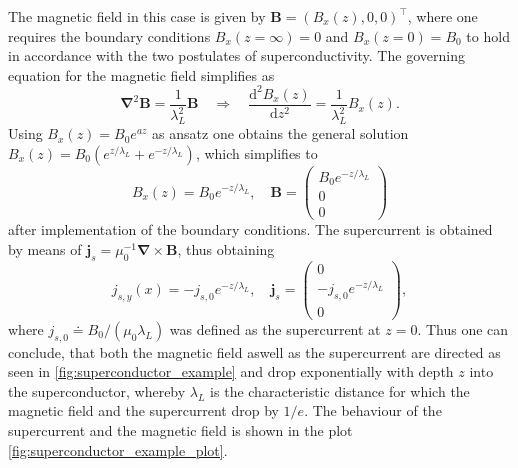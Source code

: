 \documentclass{report}
\numberwithin{tm}{section}
\newcommand\vect[1]{\ensuremath{\bm{#1}}}
\begin{document}
The magnetic field in this case is given by $\vect{B} = (B_x(z),0,0)^\top$, where one requires the boundary conditions $B_x(z=\infty)=0$ and $B_x(z=0)=B_0$ to hold in accordance with the two postulates of superconductivity. The governing equation for the magnetic field simplifies as \begin{equation}
	\vect{\nabla}^2\vect{B} = \frac{1}{\lambda_L^2}\vect{B} \quad \Rightarrow \quad \frac{\mathrm{d}^2B_x(z)}{\mathrm{d}z^2} = \frac{1}{\lambda_L^2}B_x(z).
\end{equation} Using $B_x(z) = B_0e^{az}$ as ansatz one obtains the general solution $B_x(z) = B_0(e^{z/\lambda_L}+e^{-z/\lambda_L})$, which simplifies to \begin{equation}
B_x(z) = B_0e^{-z/\lambda_L}, \quad \vect{B} = \begin{pmatrix}
	B_0 e^{-z/\lambda_L} \\ 0 \\ 0
\end{pmatrix}
\end{equation} after implementation of the boundary conditions. The supercurrent is obtained by means of $\vect{j}_s = \mu_0^{-1}\vect{\nabla} \times \vect{B}$, thus obtaining \begin{equation}
j_{s,y}(x) = -j_{s,0}e^{-z/\lambda_L}, \quad \vect{j}_s = \begin{pmatrix}
	0 \\ -j_{s,0}e^{-z/\lambda_L} \\ 0
\end{pmatrix},
\end{equation} where $j_{s,0} \doteq B_0/(\mu_0\lambda_L)$ was defined as the supercurrent at $z=0$. Thus one can conclude, that both the magnetic field aswell as the supercurrent are directed as seen in \cref{fig:superconductor_example} and drop exponentially with depth $z$ into the superconductor, whereby $\lambda_L$ is the characteristic distance for which the magnetic field and the supercurrent drop by $1/e$. The behaviour of the supercurrent and the magnetic field is shown in the plot \cref{fig:superconductor_example_plot}.
\end{document}
